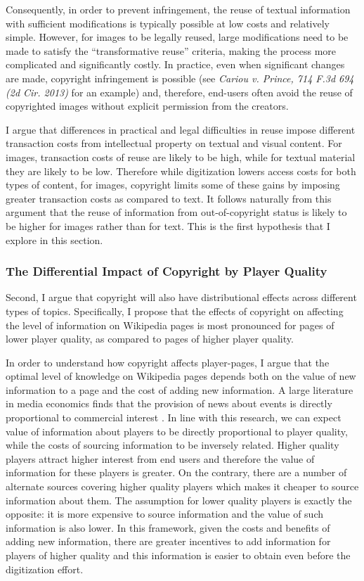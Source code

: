 \documentclass[11pt]{article}
\begin{document}
Consequently, in order to prevent infringement, the reuse of textual information with sufficient modifications is typically possible at low costs and relatively simple. However, for images to be legally reused, large modifications need to be made to satisfy the ``transformative reuse'' criteria, making the process more complicated and significantly costly. In practice, even when significant changes are made, copyright infringement is possible (see \emph{Cariou v. Prince, 714 F.3d 694 (2d Cir. 2013)} for an example) and, therefore, end-users often avoid the reuse of copyrighted images without explicit permission from the creators.

I argue that differences in practical and legal difficulties in reuse impose different transaction costs from intellectual property on textual and visual content. For images, transaction costs of reuse are likely to be high, while for textual material they are likely to be low. Therefore while digitization lowers access costs for both types of content, for images, copyright limits some of these gains by imposing greater transaction costs as compared to text. It follows naturally from this argument that the reuse of information from out-of-copyright status is likely to be higher for images rather than for text. This is the first hypothesis that I explore in this section. 


\subsubsection{The Differential Impact of Copyright by Player Quality}

Second, I argue that copyright will also have distributional effects across different types of topics. Specifically, I propose that the effects of copyright on affecting the level of information on Wikipedia pages is most pronounced for pages of lower player quality, as compared to pages of higher player quality.

In order to understand how copyright affects player-pages, I argue that the optimal level of knowledge on Wikipedia pages depends both on the value of new information to a page and the cost of adding new information. A large literature in media economics finds that the provision of news about events is directly proportional to commercial interest \citep{prat_political_2011, stromberg_natural_2007}. In line with this research, we can expect value of information about players to be directly proportional to player quality, while the costs of sourcing information to be inversely related. Higher quality players attract higher interest from end users and therefore the value of information for these players is greater. On the contrary, there are a number of alternate sources covering higher quality players which makes it cheaper to source information about them. The assumption for lower quality players is exactly the opposite: it is more expensive to source information and the value of such information is also lower. In this framework, given the costs and benefits of adding new information, there are greater incentives to add information for players of higher quality and this information is easier to obtain even before the digitization effort. 
\end{document}
